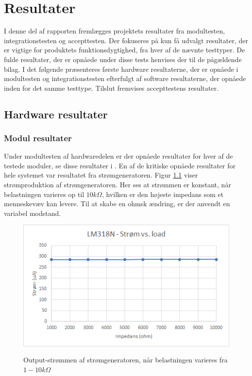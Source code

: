 \chapter{Resultater}

I denne del af rapporten fremlægges projektets resultater fra modultesten, integrationstesten og  accepttesten. Der fokuseres på kun få udvalgt resultater, der er vigtige for produktets funktionsdygtighed,  fra hver af de nævnte testtyper. De fulde resultater, der er opnåede under disse tests henvises der til de pågældende bilag. I det følgende præsenteres første hardware resultaterne, der er opnåede i modultesten og integrationstesten efterfulgt af software resultaterne, der opnåede inden for det samme testtype. Tilslut fremvises accepttestens resultater.     

\section{Hardware resultater}
\subsection{Modul resultater}
Under modultesten af hardwaredelen er der opnåede resultater for hver af de testede moduler, se disse resultater i . En af de kritiske opnåede resultater for hele systemet var resultatet fra strømgeneratoren. Figur \ref{fig:Stromgeneratorload} viser strømproduktion af strømgeneratoren. Her ses at strømmen er konstant, når belastningen varieres op til $10k \Omega$, hvilken er den højeste impedans som et menneskevæv kan levere\cite[s. 49]{Chester2014}. Til at skabe en ohmsk ændring, er der anvendt en variabel modstand.        

\begin{figure}[H] 
\centering
{\includegraphics[width=12cm]
{Figure/Stromgeneratorload}}
\caption{Output-strømmen af strømgeneratoren, når belastningen varieres fra $1 - 10k\Omega$}
\label{fig:Stromgeneratorload}
\end{figure}


